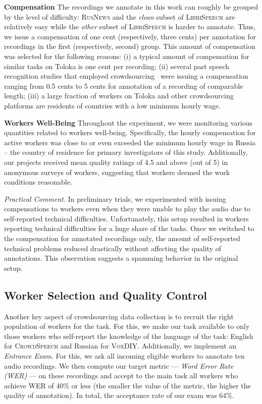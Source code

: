 \documentclass{article}
\newcommand{\libri}{\textsc{LibriSpeech}}
\newcommand{\speech}{\textsc{CrowdSpeech}}
\newcommand{\vox}{\textsc{VoxDIY}}
\newcommand{\news}{\textsc{RusNews}}
\begin{document}
\textbf{Compensation} The recordings we annotate in this work can roughly be grouped by the level of difficulty: \news{} and the \emph{clean} subset of \libri{} are relatively easy while the \emph{other} subset of \libri{} is harder to annotate. Thus, we issue a compensation of one cent (respectively, three cents) per annotation for recordings in the first (respectively, second) group. This amount of compensation was selected for the following reasons: (i) a typical amount of compensation for similar tasks on Toloka is one cent per recording; (ii) several past speech recognition studies that employed crowdsourcing~\citep{audhkhasi11accurate,marge10turk,novotney10cheap} were issuing a compensation ranging from 0.5 cents to 5 cents for annotation of a recording of comparable length; (iii) a large fraction of workers on Toloka and other crowdsourcing platforms are residents of countries with a low minimum hourly wage.



\textbf{Workers Well-Being} Throughout the experiment, we were monitoring various quantities related to workers well-being. Specifically, the hourly compensation for active workers was close to or even exceeded the minimum hourly wage in Russia -- the country of residence for primary investigators of this study. Additionally, our projects received mean quality ratings of 4.5 and above (out of 5) in anonymous surveys of workers, suggesting that workers deemed the work conditions reasonable.

\emph{Practical Comment.} In preliminary trials, we experimented with issuing compensations to workers even when they were unable to play the audio due to self-reported technical difficulties. Unfortunately, this setup resulted in workers reporting technical difficulties for a huge share of the tasks. Once we switched to the compensation for annotated recordings only, the amount of self-reported technical problems reduced drastically without affecting the quality of annotations. This observation suggests a spamming behavior in the original setup.

\subsection{Worker Selection and Quality Control}

Another key aspect of crowdsourcing data collection is to recruit the right population of workers for the task. For this, we make our task available to only those workers who self-report the knowledge of the language of the task: English for \speech{} and Russian for \vox{}. Additionally, we implement an \emph{Entrance Exam}. For this, we ask all incoming eligible workers to annotate ten audio recordings. We then compute our target metric --- \emph{Word Error Rate (WER)} --- on these recordings and accept to the main task all workers who achieve WER of 40\% or less (the smaller the value of the metric, the higher the quality of annotation).
In total, the acceptance rate of our exam was 64\%.
\end{document}

